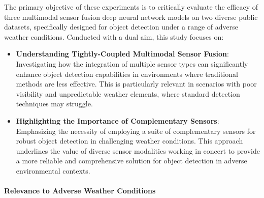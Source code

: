 \documentclass[report.tex]{subfiles}
\begin{document}
    The primary objective of these experiments is to critically evaluate the efficacy of three multimodal sensor fusion deep neural network models on two diverse public datasets, specifically designed for object detection under a range of adverse weather conditions. Conducted with a dual aim, this study focuses on:

    \begin{itemize}
        \item \textbf{Understanding Tightly-Coupled Multimodal Sensor Fusion}: Investigating how the integration of multiple sensor types can significantly enhance object detection capabilities in environments where traditional methods are less effective. This is particularly relevant in scenarios with poor visibility and unpredictable weather elements, where standard detection techniques may struggle.
        \item \textbf{Highlighting the Importance of Complementary Sensors}: Emphasizing the necessity of employing a suite of complementary sensors for robust object detection in challenging weather conditions. This approach underlines the value of diverse sensor modalities working in concert to provide a more reliable and comprehensive solution for object detection in adverse environmental contexts.
    \end{itemize}

    \paragraph*{Relevance to Adverse Weather Conditions}


\end{document}
